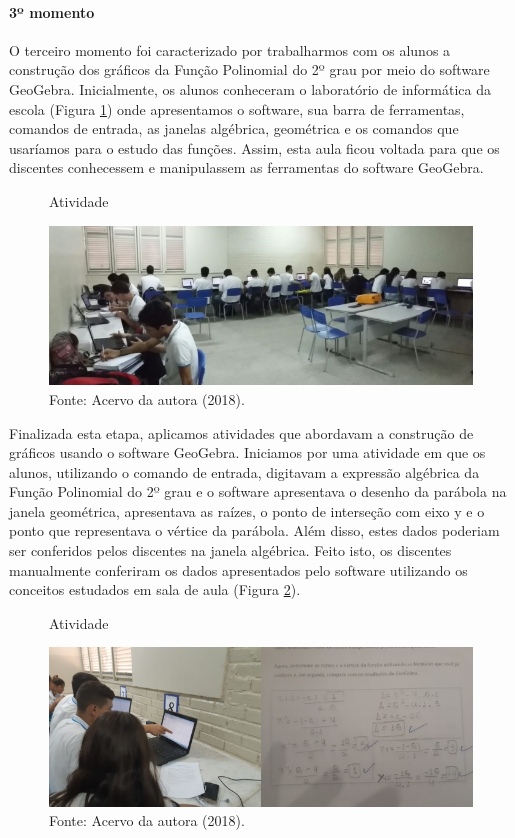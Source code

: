 \begin{refsection}
    \paragraph{3º momento} O terceiro momento foi caracterizado por trabalharmos com os alunos a construção dos gráficos da Função Polinomial do 2º grau por meio do software GeoGebra. Inicialmente, os alunos conheceram o laboratório de informática da escola (Figura \ref{fig:atividade-5}) onde apresentamos o software, sua barra de ferramentas, comandos de entrada, as janelas algébrica, geométrica e os comandos que usaríamos para o estudo das funções. Assim, esta aula ficou voltada para que os discentes conhecessem e manipulassem as ferramentas do software GeoGebra.

    \begin{figure}[ht]%
        \centering%
        \caption{Atividade}%
        \includegraphics[width=.80\textwidth]{articles/03-contribuicoes-do-sof/image12.jpeg}%
        \caption*{Fonte: Acervo da autora (2018).}%
        \label{fig:atividade-5}%
    \end{figure}%

    Finalizada esta etapa, aplicamos atividades que abordavam a construção de gráficos usando o software GeoGebra. Iniciamos por uma atividade em que os alunos, utilizando o comando de entrada, digitavam a expressão algébrica da Função Polinomial do 2º grau e o software apresentava o desenho da parábola na janela geométrica, apresentava as raízes, o ponto de interseção com eixo y e o ponto que representava o vértice da parábola. Além disso, estes dados poderiam ser conferidos pelos discentes na janela algébrica. Feito isto, os discentes manualmente conferiram os dados apresentados pelo software utilizando os conceitos estudados em sala de aula (Figura \ref{fig:atividade-6}). 

    \begin{figure}[ht]%
        \centering%
        \caption{Atividade}%
        \includegraphics[width=.80\textwidth]{articles/03-contribuicoes-do-sof/image13.jpeg}%
        \caption*{Fonte: Acervo da autora (2018).}%
        \label{fig:atividade-6}%
    \end{figure}%


\end{refsection}
